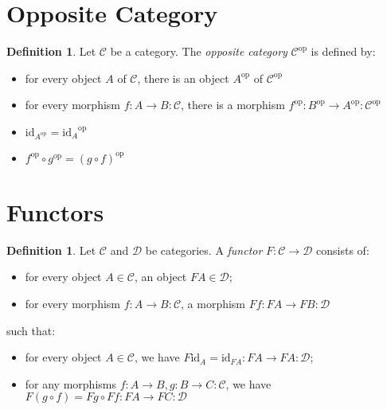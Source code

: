 \documentclass{book}
\theoremstyle{definition}
\newtheorem{df}[lm]{Definition}
\newcommand{\id}[1]{\ensuremath{\mathrm{id}_{#1}}}
\begin{document}
  \section{Opposite Category}
  
  \begin{df}
    Let $\mathcal{C}$ be a category. The \emph{opposite category} 
    $\mathcal{C}^{\mathrm{op}}$ is defined by:
    \begin{itemize}
      \item for every object $A$ of $\mathcal{C}$, there is an object 
      $A^{\mathrm{op}}$ of $\mathcal{C}^{\mathrm{op}}$
      \item for every morphism $f : A \rightarrow B : \mathcal{C}$, there is a 
      morphism $f^{\mathrm{op}} : B^{\mathrm{op}} \rightarrow A^{\mathrm{op}} : 
      \mathcal{C}^{\mathrm{op}}$
      \item $\id{A^{\mathrm{op}}} = \id{A}^{\mathrm{op}}$
      \item $f^{\mathrm{op}} \circ g^{\mathrm{op}} = (g \circ f)^{\mathrm{op}}$
    \end{itemize}
    
  \end{df}
  
  \section{Functors}
  
  \begin{df}
    Let $\mathcal{C}$ and $\mathcal{D}$ be categories. A \emph{functor} $F : 
    \mathcal{C} \rightarrow \mathcal{D}$ consists of:
    \begin{itemize}
      \item for every object $A \in \mathcal{C}$, an object $FA \in 
      \mathcal{D}$;
      \item for every morphism $f : A \rightarrow B : \mathcal{C}$, a morphism 
      $Ff : 
      FA \rightarrow FB : \mathcal{D}$
    \end{itemize}
    such that:
    \begin{itemize}
      \item for every object $A \in \mathcal{C}$, we have $F \id{A} = \id{FA} : 
      FA 
      \rightarrow FA : \mathcal{D}$;
      \item for any morphisms $f : A \rightarrow B, g : B \rightarrow C : 
      \mathcal{C}$, we have $F(g \circ f) = Fg \circ Ff : FA \rightarrow FC : 
      \mathcal{D}$
    \end{itemize}
  \end{df}
  
\end{document}
